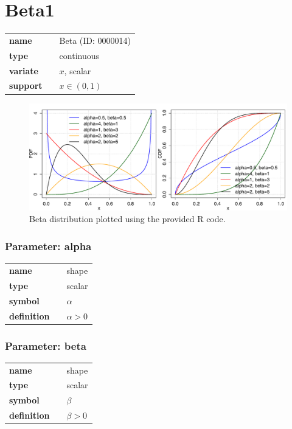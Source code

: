 \section*{Beta1} 

  \bigskip 

\begin{tabular}{p{2cm}cl}
\textbf{name} & & Beta (ID: 0000014)\\ 
 
\textbf{type} & & continuous \\ 

\textbf{variate} & & $x$, scalar \\ 

\textbf{support} & & $x \in (0,1)$
\end{tabular}

\begin{figure}[ht!]
\centering
  \includegraphics[width=140mm]{pics/Beta.pdf}
 \caption{Beta distribution plotted using the provided R code.}
 \label{fig:Beta}
\end{figure}

\subsubsection*{Parameter: alpha}

\noindent\begin{tabular}{p{2cm}cl}
\textbf{name} & & shape \\
\textbf{type} & & scalar \\
\textbf{symbol} & & $\alpha$  \\
\textbf{definition} & & $\alpha > 0$
\end{tabular}
\subsubsection*{Parameter: beta}

\noindent\begin{tabular}{p{2cm}cl}
\textbf{name} & & shape \\
\textbf{type} & & scalar \\
\textbf{symbol} & & $\beta$  \\
\textbf{definition} & & $\beta > 0$
\end{tabular}
